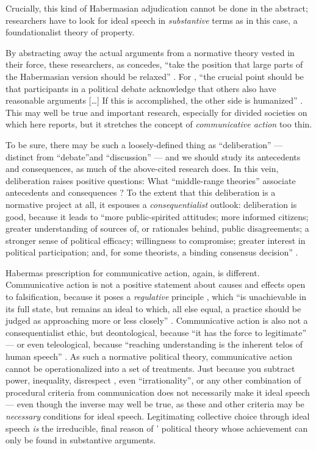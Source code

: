 Crucially, this kind of Habermasian adjudication cannot be done in the abstract;
researchers have to look for ideal speech in \emph{substantive} terms as in this case, a foundationalist theory of property.

By abstracting away the actual arguments from a normative theory vested in their force, these researchers, as \citeauthor{Steiner2012} concedes, ``take the position that large parts of the Habermasian version should be relaxed'' \citep[150]{Steiner2012}.
For \citeauthor{Steiner2012}, ``the crucial point should be that participants in a political debate acknowledge that others also have reasonable arguments
[\ldots]
If this is accomplished, the other side is humanized'' \citeyearpar[150]{Steiner2012}.
This may well be true and important research, especially for divided societies on which \citeauthor{Steiner2012} here reports, but it stretches the concept of \emph{communicative action} too thin.

To be sure, there may be such a loosely-defined thing as ``deliberation'' --- distinct from ``debate''and ``discussion''  \citep[384]{Landwehr2010} --- and we should study its antecedents and consequences, as much of the above-cited research does.
In this vein, deliberation raises positive questions:
What ``middle-range theories'' associate antecedents and consequences \citep{Mutz2008}?
To the extent that this deliberation is a normative project at all, it espouses a \emph{consequentialist} outlook:
deliberation is good, because it leads to ``more public-spirited attitudes;
more informed citizens;
greater understanding of sources of, or rationales behind, public disagreements;
a stronger sense of political efficacy;
willingness to compromise;
greater interest in political participation;
and, for some theorists, a binding consensus decision'' \citep[524]{Mutz2008}.

Habermas prescription for communicative action, again, is different.
Communicative action is not a positive statement about causes and effects open to falsification, because it poses a \emph{regulative} principle \citep{Kant1781}, which ``is unachievable in its full state, but remains an ideal to which, all else equal, a practice should be judged as approaching more or less closely'' \cite[80]{Mansbridge2010a}.
Communicative action is also not a consequentialist ethic, but deontological, because ``it has the force to legitimate'' \citep[147]{Habermas2008} --- or even teleological, because ``reaching understanding is the inherent telos of human speech'' \cite[287]{Habermas-1984}.
As such a normative political theory, communicative action cannot be operationalized into a set of treatments.
Just because you subtract power, inequality, disrespect \citep{Steenbergen2003}, even ``irrationality'', or any other combination of procedural criteria from communication  does not necessarily make it ideal speech --- even though the inverse may well be true, as these and other criteria may be \emph{necessary} conditions for ideal speech.
Legitimating collective choice through ideal speech \emph{is} the irreducible, final reason of \citeauthor{Habermas-1984}' political theory whose achievement can only be found in substantive arguments.

